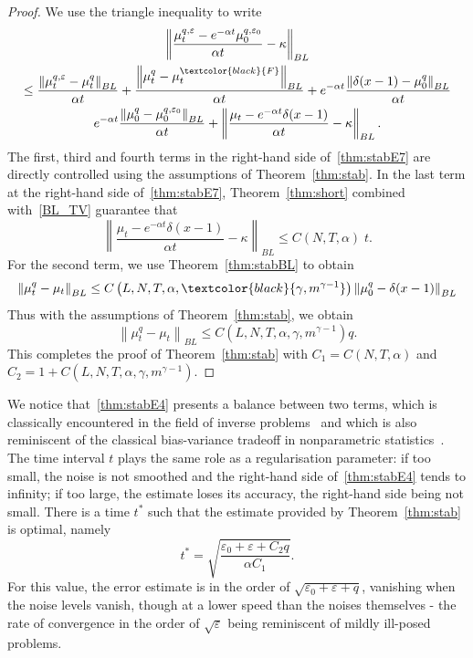 \documentclass[AHL,Unicode,longabstracts,published]{cedram}
\newcommand*\eps{\varepsilon}
\renewcommand*\a{\alpha}
\newcommand{\MT}[1]{\textcolor{black}{#1}}
\begin{document}
\begin{proof}
We use the triangle inequality to write
\begin{multline}\label{thm:stabE7}
\left\|\frac{\mu_t^{q,\eps} - e^{-\a t} \mu_0^{q,\eps_0} }{\a t}-\kappa\right\|_{BL}\\
\leq \frac{\left\|\mu_t^{q,\eps} -\mu_t^{q}\right\|_{BL}}{\a t} +\frac{\left\|\mu_t^{q} -\mu_t^{\MT{F}}\right\|_{BL}}{\a t} +e^{-\a t}\frac{\left\|\delta(x-1) -\mu_0^q\right\|_{BL}}{\a t}
\\
e^{-\a t}\frac{\left\|\mu_0^q- \mu_0^{q,\eps_0}\right\|_{BL}}{\a t} + \left\|\frac{\mu_t - e^{-\a t} \delta(x-1) }{\a t}-\kappa\right\|_{BL}.
\end{multline}
The first, third and fourth terms in the right-hand side of~\eqref{thm:stabE7} are directly controlled using the assumptions of Theorem~\ref{thm:stab}. In the last term at the right-hand side of~\eqref{thm:stabE7}, Theorem~\ref{thm:short} combined with~\eqref{BL_TV} guarantee that
\begin{equation*}
\left\|\frac{\mu_t - e^{-\a t} \delta(x-1) }{\a t}-\kappa\right\|_{BL}\leq C(N,T,\alpha)\; t.
\end{equation*}
For the second term, we use Theorem~\ref{thm:stabBL} to obtain
\begin{equation*}
\left\|\mu_t^{q} -\mu_t\right\|_{BL}
\leq C\left(L,N,T,\alpha,\MT{\gamma,m^{\gamma-1}}\right) \left\|\mu_0^q-\delta(x-1)\right\|_{BL}
\end{equation*}
Thus with the assumptions of Theorem~\ref{thm:stab}, we obtain
\begin{equation*}
\left\|\mu_t^{q} -\mu_t\right\|_{BL}
\leq  C\left(L,N,T,\alpha,\gamma,m^{\gamma-1}\right) q.
\end{equation*}
This completes the proof of Theorem~\ref{thm:stab} with $C_1= C(N,T,\alpha)$
\newline and $C_2=1+C(L,N,T,\alpha,\gamma,m^{\gamma-1}).$
\end{proof}

\begin{rema}\label{rem:t_optimal}
We notice that~\eqref{thm:stabE4} presents a balance between two terms, which is classically encountered in the field of inverse problems~\cite{Engl} and which is also reminiscent of the classical bias-variance tradeoff in nonparametric statistics~\cite{GineNickl2016}. The time interval $t$ plays the same role as a regularisation parameter: if too small, the noise is not smoothed and the right-hand side of~\eqref{thm:stabE4} tends to infinity; if too large, the estimate loses its accuracy, the right-hand side being not small. There is a time $t^*$ such that the estimate provided by Theorem~\ref{thm:stab} is optimal, namely
\begin{equation}\label{t_opt}
t^*=\sqrt{\frac{\eps_0+\eps+C_2q}{\alpha C_1}}.
\end{equation}
For this value, the error estimate is in the order of $\sqrt{\eps_0+\eps+ q}$, vanishing when the noise levels vanish, though at a lower speed than the noises themselves - the rate of convergence in the order of $\sqrt{\eps}$ being reminiscent of mildly ill-posed problems.
\end{rema}
\end{document}
